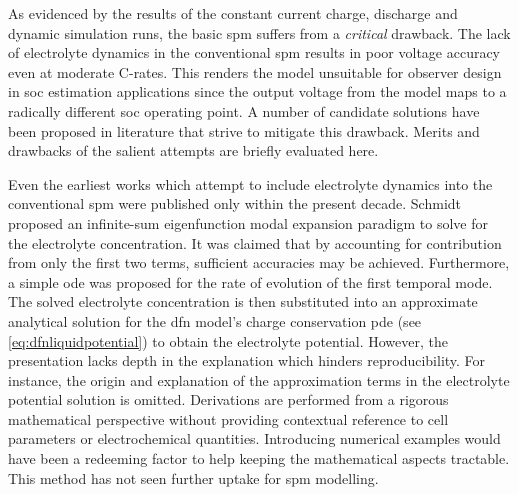 
As  evidenced by  the  results of  the constant  current  charge, discharge  and
dynamic  simulation runs,  the basic  \gls{spm} suffers  from a  \emph{critical}
drawback. The lack of electrolyte dynamics in the conventional \gls{spm} results
in poor  voltage accuracy  even at  moderate {C-rates}.  This renders  the model
unsuitable for  observer design in  \gls{soc} estimation applications  since the
output voltage from the model maps  to a radically different \gls{soc} operating
point. A  number of candidate  solutions have  been proposed in  literature that
strive to mitigate  this drawback. Merits and drawbacks of  the salient attempts
are briefly evaluated here.

Even  the  earliest   works  which  attempt  to   include  electrolyte  dynamics
into  the  conventional  \gls{spm}  were   published  only  within  the  present
decade. Schmidt~\etal~\cite{Schmidt2010c} proposed an infinite-sum eigenfunction
modal  expansion  paradigm  to  solve  for  the  electrolyte  concentration.  It
was  claimed  that by  accounting  for  contribution  from  only the  first  two
terms, sufficient  accuracies may be  achieved. Furthermore, a  simple \gls{ode}
was  proposed  for  the rate  of  evolution  of  the  first temporal  mode.  The
solved  electrolyte  concentration  is  then  substituted  into  an  approximate
analytical solution for the \gls{dfn} model's charge conservation \gls{pde} (see
\cref{eq:dfnliquidpotential}) to obtain the  electrolyte potential. However, the
presentation lacks depth  in the explanation which  hinders reproducibility. For
instance,  the  origin  and  explanation  of  the  approximation  terms  in  the
electrolyte  potential solution  is omitted.  Derivations are  performed from  a
rigorous mathematical perspective without providing contextual reference to cell
parameters or  electrochemical quantities. Introducing numerical  examples would
have been a redeeming factor to help keeping the mathematical aspects tractable.
This method has not seen further uptake for \gls{spm} modelling.

